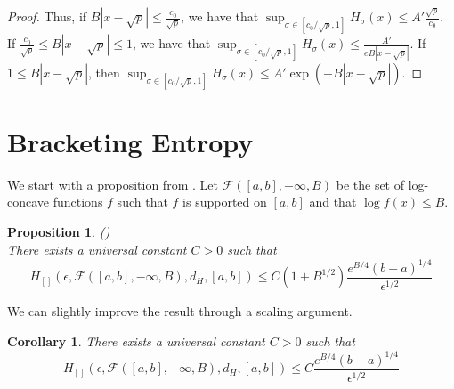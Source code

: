 \documentclass[12pt]{article}
\newtheorem{proposition}[theorem]{Proposition}
\newtheorem{corollary}[theorem]{Corollary}
\begin{document}
\begin{proof}
Thus, if $B| x - \sqrt{p}| \leq \frac{c_0}{\sqrt{p}}$, we have that $\sup_{\sigma \in [c_0/\sqrt{p}, 1]} H_{\sigma}(x) \leq A' \frac{\sqrt{p} }{c_0}$. 
If $\frac{c_0}{\sqrt{p}} \leq B | x - \sqrt{p} | \leq 1$, we have that $\sup_{\sigma \in [c_0/\sqrt{p}, 1]} H_{\sigma}(x) \leq \frac{A'}{e B | x - \sqrt{p} | }$. 
If  $1 \leq B | x - \sqrt{p} |$, then $\sup_{\sigma \in [c_0/\sqrt{p}, 1]} H_{\sigma} (x) \leq A' \exp( - B | x - \sqrt{p}|)$. 

\end{proof}


\section{Bracketing Entropy}

We start with a proposition from \citet{kim2016adaptation}. Let $\mathcal{F}([a,b], -\infty, B)$ be the set of log-concave functions $f$ such that $f$ is supported on $[a,b]$ and that $ \log f(x) \leq B$. 

\begin{proposition} (\citet[Proposition 14]{kim2016adaptation}) \\
There exists a universal constant $C > 0$ such that 
\[
H_{[]}( \epsilon, \mathcal{F}([a,b],-\infty, B), d_H, [a,b]) \leq C( 1 + B^{1/2}) \frac{ e^{B/4} (b-a)^{1/4}}{\epsilon^{1/2}} 
\]
\end{proposition}

We can slightly improve the result through a scaling argument.

\begin{corollary}
There exists a universal constant $C > 0$ such that 
\[
H_{[]}( \epsilon, \mathcal{F}([a,b],-\infty, B), d_H, [a,b]) \leq C \frac{ e^{B/4} (b-a)^{1/4}}{\epsilon^{1/2}} 
\]
\end{corollary}
\end{document}
